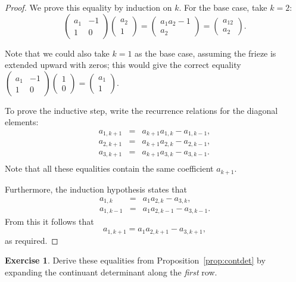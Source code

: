 \documentclass[a4paper,11pt]{amsart}
\theoremstyle{plain}
\theoremstyle{remark}
\theoremstyle{definition}
\newtheorem{exercise}[theorem]{Exercise}
\numberwithin{equation}{section}
\numberwithin{figure}{section}
\begin{document}
\begin{proof} We prove this equality by induction on $k$. For the base case, take $k=2$:
\[
\begin{pmatrix}
    a_1 &-1 \\1 &0
\end{pmatrix}
\begin{pmatrix}
    a_2\\ 1
\end{pmatrix}=
\begin{pmatrix}
    a_1a_2-1\\a_2
\end{pmatrix}=\begin{pmatrix}
    a_{12}\\a_2
\end{pmatrix}.
\]

Note that we could also take $k=1$ as the base case, assuming the frieze is extended upward with zeros; this would give the correct equality $\begin{pmatrix}
    a_1 &-1 \\1 &0
\end{pmatrix}
\begin{pmatrix}
    1\\ 0
\end{pmatrix}=
\begin{pmatrix}
    a_1\\1
\end{pmatrix}$.

To prove the inductive step, write the recurrence relations for the diagonal elements:
\begin{eqnarray*}
    a_{1,k+1}&=&a_{k+1}a_{1,k}-a_{1,k-1},\\
    a_{2,k+1}&=&a_{k+1}a_{2,k}-a_{2,k-1},\\
    a_{3,k+1}&=&a_{k+1}a_{3,k}-a_{3,k-1}.\\
\end{eqnarray*}
Note that all these equalities contain the same coefficient $a_{k+1}$.

Furthermore, the induction hypothesis states that
\begin{eqnarray*}
    a_{1,k}&=&a_1 a_{2,k}-a_{3,k},\\
    a_{1,k-1}&=&a_1 a_{2,k-1}-a_{3,k-1}.
\end{eqnarray*}
From this it follows that
\[
a_{1,k+1}=a_1 a_{2,k+1}-a_{3,k+1},
\]
as required.
\end{proof}

\begin{exercise}
Derive these equalities from Proposition~\ref{prop:contdet} by expanding the continuant determinant along the \emph{first} row.
\end{exercise}
\end{document}

